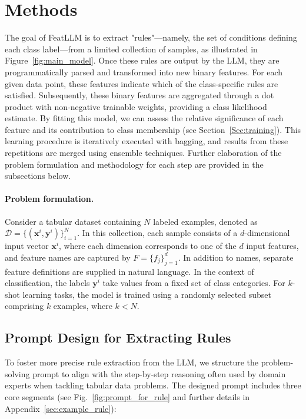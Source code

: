 \section{Methods}
The goal of \textsf{FeatLLM} is to extract "rules"—namely, the set of conditions defining each class label—from a limited collection of samples, as illustrated in Figure~\ref{fig:main_model}. Once these rules are output by the LLM, they are programmatically parsed and transformed into new binary features. For each given data point, these features indicate which of the class-specific rules are satisfied. Subsequently, these binary features are aggregated through a dot product with non-negative trainable weights, providing a class likelihood estimate. By fitting this model, we can assess the relative significance of each feature and its contribution to class membership (see Section~\ref{Sec:training}). This learning procedure is iteratively executed with bagging, and results from these repetitions are merged using ensemble techniques. Further elaboration of the problem formulation and methodology for each step are provided in the subsections below.

\vspace*{-0.12in}
\paragraph{Problem formulation.} Consider a tabular dataset containing $N$ labeled examples, denoted as $\mathcal{D} = \{(\mathbf{x}^i, \mathbf{y}^i)\}_{i=1}^{N}$. In this collection, each sample consists of a $d$-dimensional input vector $\mathbf{x}^i$, where each dimension corresponds to one of the $d$ input features, and feature names are captured by $F = \{f_j\}_{j=1}^{d}$. In addition to names, separate feature definitions are supplied in natural language. In the context of classification, the labels $\mathbf{y}^i$ take values from a fixed set of class categories. For $k$-shot learning tasks, the model is trained using a randomly selected subset comprising $k$ examples, where $k < N$.

\subsection{Prompt Design for Extracting Rules}
\label{Sec:prompt_design}
To foster more precise rule extraction from the LLM, we structure the problem-solving prompt to align with the step-by-step reasoning often used by domain experts when tackling tabular data problems. The designed prompt includes three core segments (see Fig.~\ref{fig:prompt_for_rule} and further details in Appendix~\ref{sec:example_rule}):

